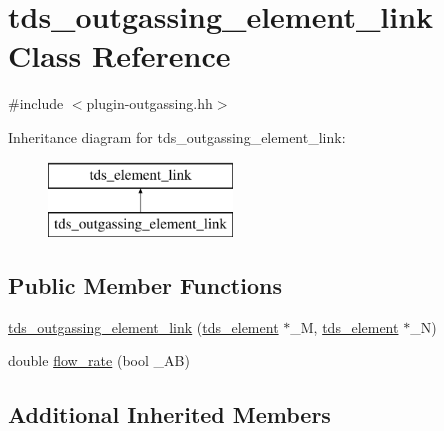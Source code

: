 \hypertarget{classtds__outgassing__element__link}{\section{tds\-\_\-outgassing\-\_\-element\-\_\-link Class Reference}
\label{classtds__outgassing__element__link}
}


{\ttfamily \#include $<$plugin-\/outgassing.\-hh$>$}

Inheritance diagram for tds\-\_\-outgassing\-\_\-element\-\_\-link\-:\begin{figure}[H]
\begin{center}
\leavevmode
\includegraphics[height=2.000000cm]{classtds__outgassing__element__link}
\end{center}
\end{figure}
\subsection*{Public Member Functions}
\begin{DoxyCompactItemize}
\item 
\hyperlink{classtds__outgassing__element__link_a21b525492ecf1ef4ea45168be8c2961c}{tds\-\_\-outgassing\-\_\-element\-\_\-link} (\hyperlink{classtds__element}{tds\-\_\-element} $\ast$\-\_\-\-M, \hyperlink{classtds__element}{tds\-\_\-element} $\ast$\-\_\-\-N)
\item 
double \hyperlink{classtds__outgassing__element__link_ad288f7affc2653226877a6c99e242bb3}{flow\-\_\-rate} (bool \-\_\-\-A\-B)
\end{DoxyCompactItemize}
\subsection*{Additional Inherited Members}


